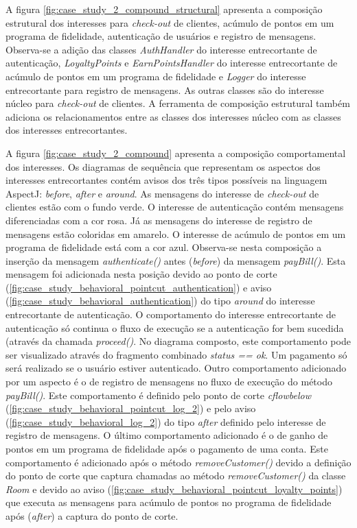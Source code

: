 A figura \ref{fig:case_study_2_compound_structural} apresenta a composição estrutural dos interesses para \textit{check-out} de clientes, acúmulo
de pontos em um programa de fidelidade, autenticação de usuários e registro de mensagens. Observa-se a adição das classes \textit{AuthHandler} do
interesse entrecortante de autenticação, \textit{LoyaltyPoints} e \textit{EarnPointsHandler} do interesse entrecortante de acúmulo de pontos em um
programa de fidelidade e \textit{Logger} do interesse entrecortante para registro de mensagens. As outras classes são do interesse núcleo para
\textit{check-out} de clientes. A ferramenta de composição estrutural também adiciona os relacionamentos entre as classes dos interesses núcleo com
as classes dos interesses entrecortantes.
  
A figura \ref{fig:case_study_2_compound} apresenta a composição comportamental dos interesses. Os diagramas de sequência que representam os aspectos
dos interesses entrecortantes contém avisos dos três tipos possíveis na linguagem AspectJ: \textit{before}, \textit{after} e \textit{around}. As
mensagens do interesse de \textit{check-out} de clientes estão com o fundo verde. O interesse de autenticação contém mensagens diferenciadas com
a cor rosa. Já as mensagens do interesse de registro de mensagens estão coloridas em amarelo. O interesse de acúmulo de pontos em um programa de
fidelidade está com a cor azul. Observa-se nesta composição a inserção da mensagem \textit{authenticate()} antes (\textit{before}) da mensagem
\textit{payBill()}. Esta mensagem foi adicionada nesta posição devido ao ponto de corte (\ref{fig:case_study_behavioral_pointcut_authentication}) e
aviso (\ref{fig:case_study_behavioral_authentication}) do tipo \textit{around} do interesse entrecortante de autenticação. O comportamento do interesse 
entrecortante de autenticação só continua o fluxo de execução se a autenticação for bem sucedida (através da chamada \textit{proceed()}. No diagrama
composto, este comportamento pode ser visualizado através do fragmento combinado \textit{status == ok}. Um pagamento só será realizado se o usuário estiver 
autenticado. Outro comportamento adicionado por um aspecto é o de registro de mensagens no fluxo de execução do método \textit{payBill()}. Este
comportamento é definido pelo ponto de corte \textit{cflowbelow} (\ref{fig:case_study_behavioral_pointcut_log_2}) e pelo aviso (\ref{fig:case_study_behavioral_log_2}) 
do tipo \textit{after} definido pelo interesse de registro de mensagens. O último comportamento adicionado é o de ganho de pontos em um programa de
fidelidade após o pagamento de uma conta. Este comportamento é adicionado após o método \textit{removeCustomer()} devido a definição do ponto de corte
que captura chamadas ao método \textit{removeCustomer()} da classe \textit{Room} e devido ao aviso
(\ref{fig:case_study_behavioral_pointcut_loyalty_points}) que executa as mensagens para acúmulo de pontos no programa de fidelidade após
(\textit{after}) a captura do ponto de corte.

